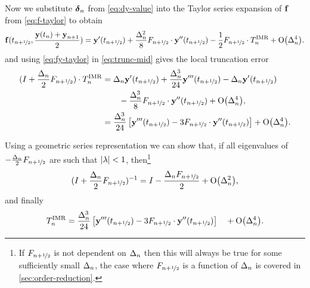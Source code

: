 Now we substitute $\dyn$ from \cref{eq:dy-value} into the Taylor series expansion of $\fv$ from \cref{eq:f-taylor} to obtain
\begin{equation}
  \fv(\thf, \frac{\yv(t_n) + \yv_{n+1}}{2}) = \yvhf[']
  + \frac{\dtn^2}{8} \dfdyhf \cdot \yvhf[''] - \frac{1}{2} \dfdyhf \cdot \lte^\imr + \order{\dtn^4}
  . \label{eq:fy-taylor}
\end{equation}
and using \cref{eq:fy-taylor} in \cref{eq:trunc-mid} gives the local truncation error
\begin{equation}
  \begin{aligned}
    (I + \frac{\dtn}{2}\dfdyhf) \cdot\lte^\imr
    &= \dtn \yvhf['] + \frac{\dtn^3}{24} \yvhf['''] - \dtn \yvhf['] \\
    &\qquad- \frac{\dtn^3}{8} \dfdyhf \cdot \yvhf[''] + \order{\dtn^4}, \\
    &= \frac{\dtn^3}{24} \left[\yvhf['''] - 3 \dfdyhf \cdot \yvhf[''] \right]
    + \order{\dtn^4}.
    \label{eq:trunc-implicit-form}
  \end{aligned}
\end{equation}

Using a geometric series representation we can show that, if all eigenvalues of  $-\frac{\dtn}{2}\dfdyhf$ are such that $\abs{\lambda} < 1$, then\footnote{If $\dfdyhf$ is not dependent on $\dtn$ then this will always be true for some sufficiently small $\dtn$, the case where $\dfdyhf$ is a function of $\dtn$ is covered in \cref{sec:order-reduction}.} \cite{??ds}
\begin{equation}
  (I + \frac{\dtn}{2}\dfdyhf)^{-1} = I - \frac{\dtn \dfdyhf}{2}  + \order{\dtn^2},
\end{equation}
and finally
\begin{equation}
  \lte^\imr = \frac{\dtn^3}{24} \left[\yvhf['''] - 3 \dfdyhf \cdot \yvhf[''] \right]
  \quad +\order{\dtn^4}.
\end{equation}


